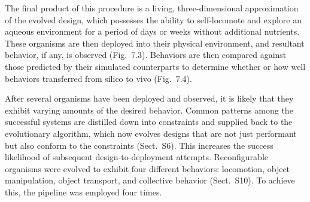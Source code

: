 The final product of this procedure is a living, three-dimensional approximation of the evolved design, which possesses the ability to self-locomote and explore an aqueous environment for a period of days or weeks without additional nutrients. 
These organisms are then deployed into their physical environment, and resultant behavior, if any, is observed (Fig.~7.3). 
Behaviors are then compared against those predicted by their simulated counterparts to determine whether or how well behaviors transferred from silico to vivo (Fig.~7.4).

After several organisms have been deployed and observed, it is likely that they exhibit varying amounts of the desired behavior. 
Common patterns among the successful systems are distilled down into constraints and supplied back to the evolutionary algorithm, which now evolves designs that are not just performant but also conform to the constraints (Sect.~S6). 
This increases the success likelihood of subsequent design-to-deployment attempts.
Reconfigurable organisms were evolved to exhibit four different behaviors: locomotion, object manipulation, object transport, and collective behavior (Sect.~S10). To achieve this, the pipeline was employed four times. 


